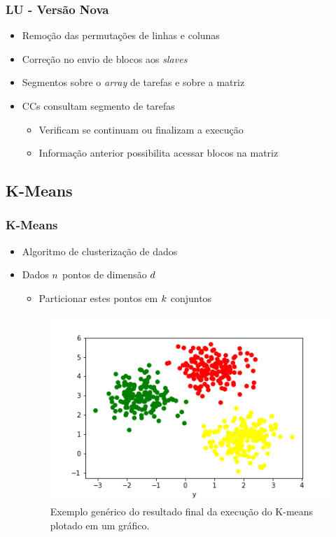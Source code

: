 \documentclass[xcolor={table}]{beamer}
\begin{document}
\begin{frame}\frametitle{LU - Versão Nova}
    \begin{itemize}
        \item {Remoção das permutações de linhas e colunas}
        \item {Correção no envio de blocos aos \textit{slaves}}
        \item {Segmentos sobre o \textit{array} de tarefas e sobre a matriz}
        \item {CCs consultam segmento de tarefas}
        \begin{itemize}
            \item {Verificam se continuam ou finalizam a execução}
            \item {Informação anterior possibilita acessar blocos na matriz}
        \end{itemize}
    \end{itemize}
\end{frame}

\subsection{K-Means}
\begin{frame}\frametitle{K-Means}
    \begin{itemize}
        \item {Algoritmo de clusterização de dados}
        \item {Dados $\mathnormal{n}$ pontos de dimensão $\mathnormal{d}$}
        \begin{itemize}
            \item {Particionar estes pontos em $\mathnormal{k}$ conjuntos}
        \end{itemize}
        \begin{figure}
            \centering
            \includegraphics[width=.7\linewidth, keepaspectratio]{figs/kmeans_data.png}
            \caption{Exemplo genérico do resultado final da execução do K-means plotado em um gráfico.}
            \label{fig:kmeansdata}
        \end{figure}
    \end{itemize}
\end{frame}
\end{document}
